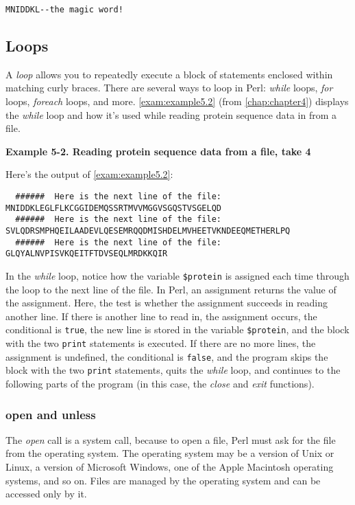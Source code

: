 \begin{lstlisting}
MNIDDKL--the magic word!
\end{lstlisting}

\subsection{Loops}
A \textit{loop} allows you to repeatedly execute a block of statements enclosed within matching curly braces. There are several ways to loop in Perl: \textit{while} loops, \textit{for} loops, \textit{foreach} loops, and more. \autoref{exam:example5.2} (from \autoref{chap:chapter4}) displays the \textit{while} loop and how it's used while reading protein sequence data in from a file. 

\textbf{Example 5-2. Reading protein sequence data from a file, take 4}


Here's the output of \autoref{exam:example5.2}:

\begin{lstlisting}
  ######  Here is the next line of the file:
MNIDDKLEGLFLKCGGIDEMQSSRTMVVMGGVSGQSTVSGELQD
  ######  Here is the next line of the file:
SVLQDRSMPHQEILAADEVLQESEMRQQDMISHDELMVHEETVKNDEEQMETHERLPQ
  ######  Here is the next line of the file:
GLQYALNVPISVKQEITFTDVSEQLMRDKKQIR
\end{lstlisting}

In the \textit{while} loop, notice how the variable \verb|$protein| is assigned each time through the loop to the next line of the file. In Perl, an assignment returns the value of the assignment. Here, the test is whether the assignment succeeds in reading another line. If there is another line to read in, the assignment occurs, the conditional is \verb|true|, the new line is stored in the variable \verb|$protein|, and the block with the two \verb|print| statements is executed. If there are no more lines, the assignment is undefined, the conditional is \verb|false|, and the program skips the block with the two \verb|print| statements, quits the \textit{while} loop, and continues to the following parts of the program (in this case, the \textit{close} and \textit{exit} functions). 

\subsubsection{open and unless}
The \textit{open} call is a system call, because to open a file, Perl must ask for the file from the operating system. The operating system may be a version of Unix or Linux, a version of Microsoft Windows, one of the Apple Macintosh operating systems, and so on. Files are managed by the operating system and can be accessed only by it.

